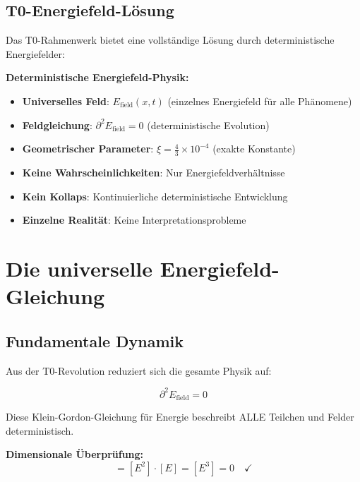 \documentclass[12pt,a4paper]{report}
\begin{document}
	\subsection{T0-Energiefeld-Lösung}
	\label{subsec:t0_solution}
	
	Das T0-Rahmenwerk bietet eine vollständige Lösung durch deterministische Energiefelder:
	
	\begin{tcolorbox}[colback=blue!5!white,colframe=blue!75!black,title=T0 Deterministische Grundlage]
		\textbf{Deterministische Energiefeld-Physik:}
		\begin{itemize}
			\item \textbf{Universelles Feld}: $E_{\text{field}}(x,t)$ (einzelnes Energiefeld für alle Phänomene)
			\item \textbf{Feldgleichung}: $\partial^2 E_{\text{field}} = 0$ (deterministische Evolution)
			\item \textbf{Geometrischer Parameter}: $\xi = \frac{4}{3} \times 10^{-4}$ (exakte Konstante)
			\item \textbf{Keine Wahrscheinlichkeiten}: Nur Energiefeldverhältnisse
			\item \textbf{Kein Kollaps}: Kontinuierliche deterministische Entwicklung
			\item \textbf{Einzelne Realität}: Keine Interpretationsprobleme
		\end{itemize}
	\end{tcolorbox}
	
	\section{Die universelle Energiefeld-Gleichung}
	\label{sec:universal_field_equation}
	
	\subsection{Fundamentale Dynamik}
	\label{subsec:fundamental_dynamics}
	
	Aus der T0-Revolution reduziert sich die gesamte Physik auf:
	
	\begin{equation}
		\boxed{\partial^2 E_{\text{field}} = 0}
		\label{eq:universal_field_equation}
	\end{equation}
	
	Diese Klein-Gordon-Gleichung für Energie beschreibt ALLE Teilchen und Felder deterministisch.
	
	\textbf{Dimensionale Überprüfung:}
	\begin{equation}
		[\partial^2 E_{\text{field}}] = [E^2] \cdot [E] = [E^3] = 0 \quad \checkmark
	\end{equation}
	
\end{document}
